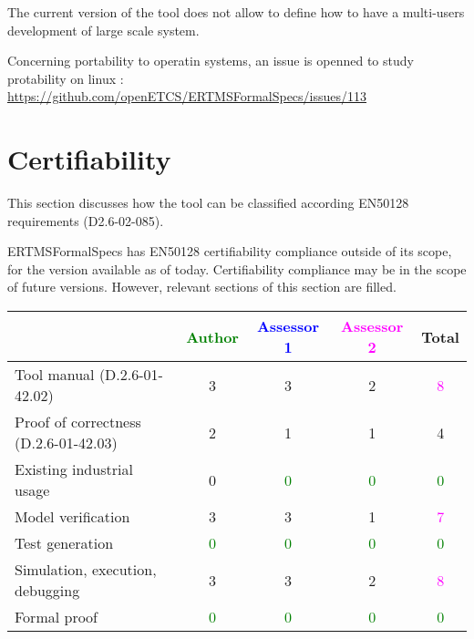 \begin{assessor2}
The current version of the tool does not allow to  define how to  have a multi-users development of large scale system.
\end{assessor2}

\begin{author_comment}
Concerning portability to operatin systems, an issue is openned to study protability on linux :
\url{https://github.com/openETCS/ERTMSFormalSpecs/issues/113}
\end{author_comment}

\section{Certifiability}

This section discusses how the tool can be classified according EN50128 requirements (D2.6-02-085).

\begin{author_comment}
ERTMSFormalSpecs has EN50128 certifiability compliance outside of its scope, for the version available as of today. Certifiability compliance may be in the scope of future versions. However, relevant sections of this section are filled.
\end{author_comment}

\begin{tabular}{|l | c | c | c | c|}
\hline
& \textcolor{green}{Author} & \textcolor{blue}{Assessor 1} & \textcolor{magenta}{Assessor 2} & Total \\
\hline 
Tool manual (D.2.6-01-42.02) & 3     & 3     & 2     & \textcolor{magenta}{8}  \\
\hline
Proof of correctness (D.2.6-01-42.03) & 2     & 1     & 1     & 4     \\
\hline
Existing industrial  usage &  0 & \textcolor{green}{0} & \textcolor{green}{0} & \textcolor{green}{0} \\
\hline
Model verification & 3     & 3     & 1     & \textcolor{magenta}{7} \\
\hline
Test generation & \textcolor{green}{0} & \textcolor{green}{0} & \textcolor{green}{0} & \textcolor{green}{0} \\
\hline
Simulation, execution, debugging & 3     & 3     & 2     & \textcolor{magenta}{8} \\
\hline
Formal proof & \textcolor{green}{0} & \textcolor{green}{0} & \textcolor{green}{0} & \textcolor{green}{0} \\
\hline
\end{tabular}

